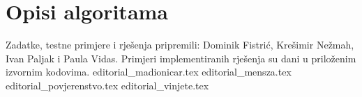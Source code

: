 \documentclass[a4paper]{article}
\date{May 29th 2022.}
\begin{document}
\section*{Opisi algoritama}
Zadatke, testne primjere i rješenja pripremili: Dominik Fistrić, Krešimir
Nežmah, Ivan Paljak i Paula Vidas.  Primjeri implementiranih rješenja su dani
u priloženim izvornim kodovima.
{editorial_madionicar.tex}
\clearpage
{editorial_mensza.tex}
\clearpage
{editorial_povjerenstvo.tex}
\clearpage
{editorial_vinjete.tex}
\clearpage
\end{document}
